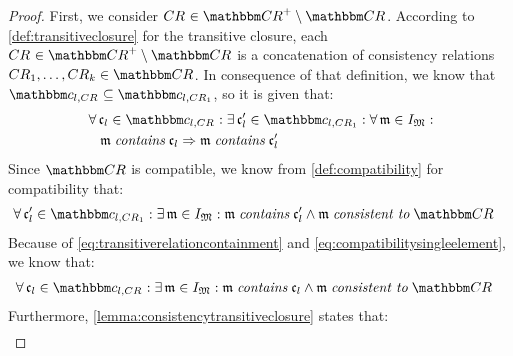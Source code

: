 \begin{proof}
    First, we consider $\consistencyrelation{CR}{} \in \transitiveclosure{\consistencyrelationset{CR}} \setminus \consistencyrelationset{CR}$.
    According to \autoref{def:transitiveclosure} for the transitive closure, each $\consistencyrelation{CR}{} \in \transitiveclosure{\consistencyrelationset{CR}} \setminus \consistencyrelationset{CR}$ is a concatenation of consistency relations $\consistencyrelation{CR}{1}, \dots, \consistencyrelation{CR}{k} \in \consistencyrelationset{CR}$.
    In consequence of that definition, we know that $\condition{c}{l,\consistencyrelation{CR}{}} \subseteq \condition{c}{l,\consistencyrelation{CR}{1}}$, so it is given that:
    \begin{align}
        & \nonumber \label{eq:transitiverelationcontainment}
        \forall \conditionelement{c}{l} \in \condition{c}{l,\consistencyrelation{CR}{}} : \exists \conditionelement{c}{l}' \in \condition{c}{l,\consistencyrelation{CR}{1}} : \forall \modeltuple{m} \in \metamodeltupleinstanceset{M} : \\ 
        & \formulaskip
        \modeltuple{m} \containsmath \conditionelement{c}{l} \Rightarrow \modeltuple{m} \containsmath \conditionelement{c}{l}'
    \end{align}
    Since $\consistencyrelationset{CR}$ is compatible, we know from \autoref{def:compatibility} for compatibility that:
    \begin{align}
        & 
        \label{eq:compatibilitysingleelement}
        \forall \conditionelement{c}{l}' \in \condition{c}{l, \consistencyrelation{CR}{1}}
        : \exists \modeltuple{m} \in \metamodeltupleinstanceset{M} :
        \modeltuple{m} \containsmath \conditionelement{c}{l}' \land \modeltuple{m} \consistenttomath \consistencyrelationset{CR}
    \end{align}
    Because of \autoref{eq:transitiverelationcontainment} and \autoref{eq:compatibilitysingleelement}, we know that:
    \begin{align}
        &
        \label{eq:compatibilitysinglelementtransitive}
        \forall \conditionelement{c}{l} \in \condition{c}{l, \consistencyrelation{CR}{}}
        : \exists \modeltuple{m} \in \metamodeltupleinstanceset{M} :
        \modeltuple{m} \containsmath \conditionelement{c}{l} \land \modeltuple{m} \consistenttomath \consistencyrelationset{CR}
    \end{align}  
    Furthermore, \autoref{lemma:consistencytransitiveclosure} states that:
    \begin{align}
        & \label{eq:consistencytransitiveequal}

\end{align}
\end{proof}

